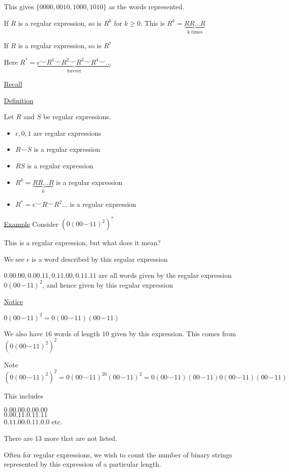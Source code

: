 \documentclass{article}
\begin{document}
This gives $\{0000,0010,1000,1010\}$ as the words represented.

If $R$ is a regular expression, so is $R^k$ for $k \ge 0$. This is $R^k = \underbrace{RR \ldots R}_{\text{k times}}$

If $R$ is a regular expression, so is $R^*$

Here $R^* = \underbrace{\epsilon \smile R^1 \smile R^2 \smile R^3 \smile R^4 \smile \ldots}_{\text{forever}}$

\underline{Recall}

\underline{Definition}

Let $R$ and $S$ be regular expressions. 

\begin{itemize}
    \item $\epsilon, 0, 1$ are regular expressions
    \item $R \smile S$ is a regular expression
    \item $RS$ is a regular expression
    \item $R^k = \underbrace{RR\ldots R}_{k}$ is a regular expression
    \item $R^* = \epsilon \smile R \smile R^2 \ldots $ is a regular expression
\end{itemize}

\underline{Example} Consider $(0(00\smile11)^2)^*$

This is a regular expression, but what does it mean?

We see $\epsilon$ is a word described by this regular expression

$0.00.00, 0.00.11, 0.11.00, 0.11.11$ are all words given by the regular expression $0(00\smile11)^2$, and hence given by this regular expression

\underline{Notice}

$0(00\smile11)^2 = 0(00\smile11)(00\smile11)$

We also have $16$ words of length $10$ given by this expression. This comes from $(0(00\smile11)^2)^2$

Note $(0(00\smile11)^2)^2 = 0(00\smile11)^20(00\smile11)^2 = 0(00\smile11)(00\smile11)0(00\smile11)(00\smile11)$

This includes

$0.00.00.0.00.00$ \\
$0.00.11.0.11.11$ \\
$0.11.00.0.11.0.0$ etc.

There are $13$ more that are not listed.

Often for regular expressions, we wish to count the number of binary strings represented by this expression of a particular length. 
\end{document}
